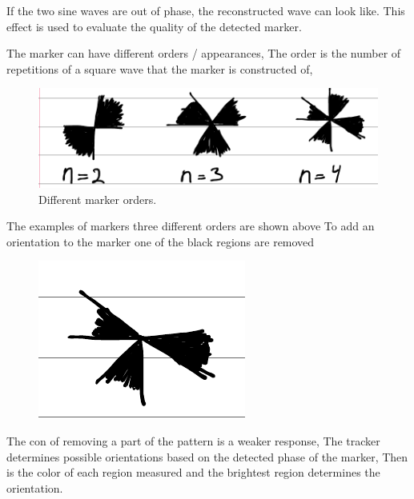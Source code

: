 \documentclass[10pt,a4paper]{article}
\begin{document}
If the two sine waves are out of phase, the
reconstructed wave can look like.
\missingfigure{}
This effect is used to evaluate the quality
of the detected marker.

The marker can have different orders / appearances,
The order is the number of repetitions of a
square wave that the marker is constructed of,

\begin{figure}[ht]
\centering
\includegraphics[width=0.8\linewidth]{pic/differentmarkerorders.png}
\caption{Different marker orders.}
\label{figOrdersOfMarkers}
\end{figure}

The examples of markers three different orders
are shown above To add an orientation to
the marker one of the black regions are
removed

\begin{figure}[ht]
\centering
\includegraphics[width=0.3\linewidth]{pic/markerwithindicatedorientation.png}
\caption{}
\label{fig}
\end{figure}

The con of removing a part of the pattern is
a weaker response, The tracker determines possible
orientations based on the detected phase of the
marker, Then is the color of each region
measured and the brightest region determines
the orientation.
\end{document}

